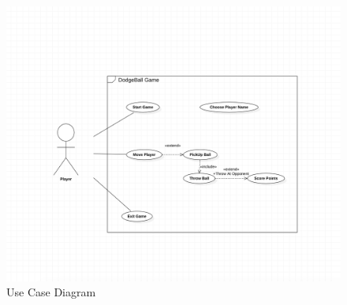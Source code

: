 \documentclass[12pt]{report}
\begin{document}
\setlength{\parindent}{0em}
\setlength{\parskip}{0em}
\renewcommand{\baselinestretch}{1.5}
\vspace{0.5cm}
\begin{figure}[h]
\centering
\includegraphics[scale=0.5]{Use case.png}
\caption{ Use Case Diagram}
\label{ Use Case Diagram}
\end{figure}
\vspace{0.1cm}

\clearpage
\end{document}
